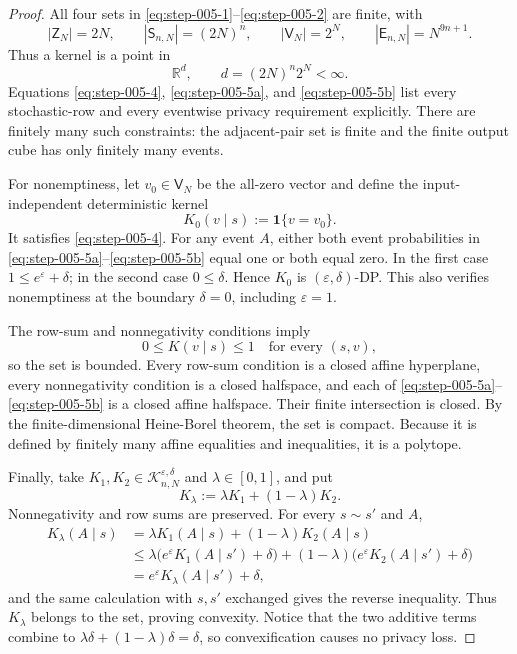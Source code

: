 \begin{proof}

All four sets in \eqref{eq:step-005-1}--\eqref{eq:step-005-2} are finite, with
\[
|\mathsf Z_N|=2N,
\qquad
|\mathsf S_{n,N}|=(2N)^n,
\qquad
|\mathsf V_N|=2^N,
\qquad
|\mathsf E_{n,N}|=N^{9n+1}.
\tag{6}\label{eq:step-005-6}
\]
Thus a kernel is a point in
\[
\mathbb R^d,
\qquad
d=(2N)^n2^N<\infty.
\tag{7}\label{eq:step-005-7}
\]
Equations \eqref{eq:step-005-4}, \eqref{eq:step-005-5a}, and \eqref{eq:step-005-5b} list every stochastic-row and every eventwise privacy requirement explicitly. There are finitely many such constraints: the adjacent-pair set is finite and the finite output cube has only finitely many events.

For nonemptiness, let \(v_0 \in \mathsf V_N\) be the all-zero vector and define the input-independent deterministic kernel
\[
K_0(v\mid s):=\mathbf 1\{v=v_0\}.
\tag{8}\label{eq:step-005-8}
\]
It satisfies \eqref{eq:step-005-4}. For any event \(A\), either both event probabilities in \eqref{eq:step-005-5a}--\eqref{eq:step-005-5b} equal one or both equal zero. In the first case
\(1\le e^\varepsilon+\delta\); in the second case
\(0\le\delta\). Hence \(K_0\) is \((\varepsilon,\delta)\)-DP. This also verifies nonemptiness at the boundary \(\delta=0\), including \(\varepsilon=1\).

The row-sum and nonnegativity conditions imply
\[
0\le K(v\mid s)\le1
\quad\text{for every }(s,v),
\tag{9}\label{eq:step-005-9}
\]
so the set is bounded. Every row-sum condition is a closed affine hyperplane, every nonnegativity condition is a closed halfspace, and each of \eqref{eq:step-005-5a}--\eqref{eq:step-005-5b} is a closed affine halfspace. Their finite intersection is closed. By the finite-dimensional Heine-Borel theorem, the set is compact. Because it is defined by finitely many affine equalities and inequalities, it is a polytope.

Finally, take \(K_1,K_2 \in \mathcal K_{n,N}^{\varepsilon,\delta}\) and \(\lambda \in [0,1]\), and put
\[
K_\lambda:=\lambda K_1+(1-\lambda)K_2.
\tag{10}\label{eq:step-005-10}
\]
Nonnegativity and row sums are preserved. For every \(s \sim s'\) and \(A\),
\[
\begin{aligned}
K_\lambda(A\mid s)
&=\lambda K_1(A\mid s)+(1-\lambda)K_2(A\mid s)\\
&\le
\lambda\bigl(e^\varepsilon K_1(A\mid s')+\delta\bigr)
+(1-\lambda)\bigl(e^\varepsilon K_2(A\mid s')+\delta\bigr)\\
&=e^\varepsilon K_\lambda(A\mid s')+\delta,
\end{aligned}
\tag{11}\label{eq:step-005-11}
\]
and the same calculation with \(s,s'\) exchanged gives the reverse inequality. Thus \(K_\lambda\) belongs to the set, proving convexity. Notice that the two additive terms combine to
\(\lambda\delta+(1-\lambda)\delta=\delta\), so convexification causes no privacy loss.

\end{proof}


